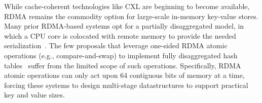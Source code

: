 While
cache-coherent technologies like CXL are beginning to become
available, RDMA remains the commodity option for large-scale in-memory
key-value stores.
%
Many prior RDMA-based systems opt for
a partially disaggregated model, in which a CPU core is
colocated with remote memory to provide the needed
serialization~\cite{erpc,herd,pilaf,cell,clover}.
%
%
The few proposals that leverage one-sided RDMA atomic operations
(e.g., compare-and-swap) to implement fully disaggregated hash
tables~\cite{rolex,fusee,sherman, race} suffer from the limited scope
of such operations.  Specifically, RDMA atomic operations can only act
upon 64 contiguous bits of memory at a time, forcing these systems to design
multi-stage datastructures to support practical key and value sizes.

